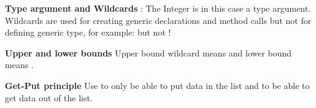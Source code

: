 \documentclass{article}
\begin{document}
\begin{Parallel}[v]{0.49\textwidth}{0.49\textwidth}
{        \textbf{Type argument and Wildcards}\newline
        :
        The Integer is in this case a type argument.\\
        Wildcards are used for creating generic declarations and method calls but not for defining generic type,
        for example:  but not !

        \textbf{Upper and lower bounds}\newline
        Upper bound wildcard means  and lower bound means .

        \textbf{Get-Put principle}\newline
        Use  to only be able to put data in the list and
         to be able to get data out of the list.
    }
    \ParallelPar
\end{Parallel}
\end{document}
